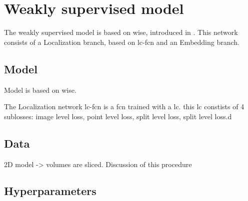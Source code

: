 \section{Weakly supervised model}

The weakly supervised model is based on \gls{wise}, introduced in \cite{Laradji2020}.
This network consists of a Localization branch, based on \gls{lc-fcn} and an Embedding branch.

\subsection{Model}

Model is based on \gls{wise}.

The Localization network \gls{lc-fcn} is a \acrfull{fcn} trained with a \acrfull{lc}.
this \acrshort{lc} constists of 4 sublosses: image level loss, point level loss, split level loss, split level loss.d

\subsection{Data}

2D model -> volumes are sliced.
Discussion of this procedure

\subsection{Hyperparameters}